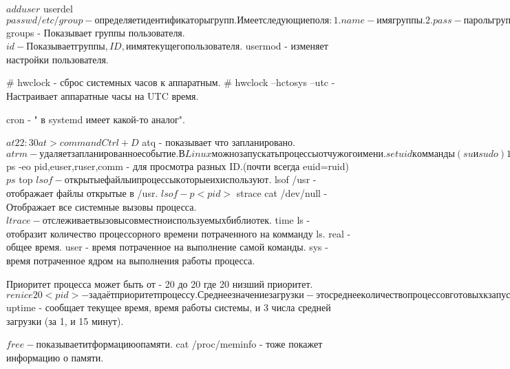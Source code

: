 $ adduser
$ userdel
$ passwd

/etc/group - определяет идентификаторы групп. Имеет следующие поля:
1. name - имя группы.
2. pass - пароль группы.
3. GID  - ID группы.
4. user - участники группы в дополнение тем которые указаны в /etc/password

$ groups - Показывает группы пользователя.
$ id - Показывает группы, ID, и имя текущего пользователя.
$ usermod - изменяет настройки пользователя.

# hwclock - сброс системных часов к аппаратным.
# hwclock --hctosys --utc - Настраивает аппаратные часы на UTC время.

cron - " в systemd имеет какой-то аналог".

$ at 22:30
at> command
Ctrl+D
$ atq - показывает что запланировано.
$ atrm - удаляет запланированное событие.

В Linux можно запускать процессы от чужого имени. setuid комманды (su и sudo)
1. euid - эфективный ID. (исполнитель)
2. ruid - реальный ID.   (владелец)
3. suid - сохраненный ID.
4. fsuid - ID пользователя файловой системой.

$ ps -eo pid,euser,ruser,comm - для просмотра разных ID.(почти всегда euid=ruid)
$ ps
$ top 
$ lsof - открытые файлы и процессы которые их используют.
$ lsof /usr - отображает файлы открытые в /usr.
$ lsof -p <pid>
$ strace cat /dev/null - Отображает все системные вызовы процесса.
$ ltrace - отслеживает вызовы совместно используемых библиотек.
$ time ls - отобразит количество процессорного времени потраченного на комманду ls.
real - общее время.
user - время потраченное на выполнение самой команды.
sys  - время потраченное ядром на выполнения работы процесса.

Приоритет процесса может быть от - 20 до 20 где 20 низший приоритет.
$ renice 20 <pid> - задаёт приоритет процессу.
Среднее значение загрузки - это среднее количество процессов готовых к запуску 
                            (на исполнение для процесора).
$ uptime - сообщает текущее время, время работы системы, и 3 числа средней
загрузки (за 1, и 15 минут).

$ free - показывает итформацию о памяти.
$ cat /proc/meminfo - тоже покажет информацию о памяти.

